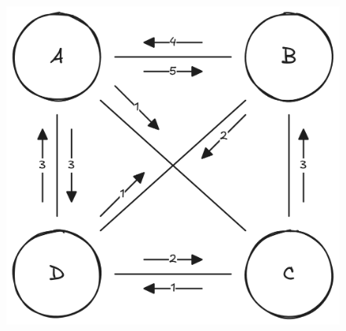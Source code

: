 \begin{figure}[p]
    \centering
    \includegraphics[width=1\textwidth]{./assets/4.22.a.png}
    \caption{}
    \label{fig:4.22.a}
\end{figure}

\FloatBarrier
